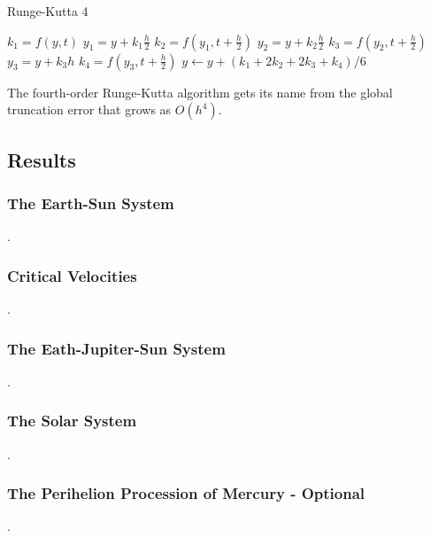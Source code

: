 \documentclass[11pt]{article}
\begin{document}
    \begin{algorithm}[H]
    \caption{Runge-Kutta 4}
    \label{Runge-Kutta 4}
    \begin{algorithmic}[1]
    \State $k_1 = f(y,t)$
    \State $y_1 = y + k_1 \frac{h}{2}$
    \State $k_2 = f(y_1,t+\frac{h}{2})$
    \State $y_2 = y + k_2 \frac{h}{2}$
    \State $k_3 = f(y_2,t+\frac{h}{2})$
    \State $y_3 = y + k_3 h$
    \State $k_4 = f(y_3 , t+\frac{h}{2})$
    \State $y \gets y + (k_1+2k_2+2k_3+k_4)/6$
    \EndFor
    \EndFunction
    \end{algorithmic}
    \end{algorithm}

    The fourth-order Runge-Kutta algorithm gets its name from the global truncation error that grows as $O(h^4)$.

\subsection{Results}

\subsubsection{The Earth-Sun System}

    .

\subsubsection{Critical Velocities}

    .

\subsubsection{The Eath-Jupiter-Sun System}

    .

\subsubsection{The Solar System}

    .

\subsubsection{The Perihelion Procession of Mercury - Optional}

    .
\end{document}
